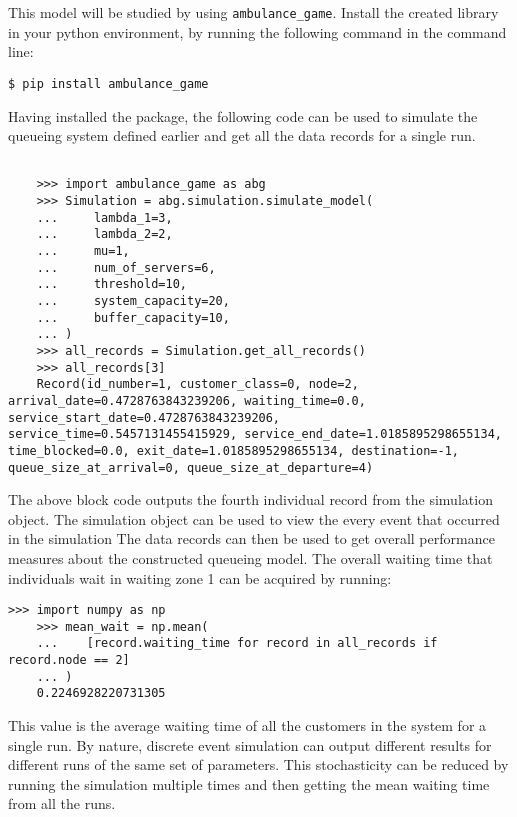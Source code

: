 This model will be studied by using  
\lstinline[style=pystyle]{ambulance_game}.
Install the created library in your python environment, by running the 
following command in the command line:
\begin{lstlisting}[style=terminalstyle]
    $ pip install ambulance_game
\end{lstlisting}

Having installed the package, the following code can be used to simulate the 
queueing system defined earlier and get all the data records for a single run.

\begin{lstlisting}[style=pystyle]
    
    >>> import ambulance_game as abg
    >>> Simulation = abg.simulation.simulate_model(
    ...     lambda_1=3,
    ...     lambda_2=2,
    ...     mu=1,
    ...     num_of_servers=6,
    ...     threshold=10,
    ...     system_capacity=20,
    ...     buffer_capacity=10,
    ... )
    >>> all_records = Simulation.get_all_records()
    >>> all_records[3]
    Record(id_number=1, customer_class=0, node=2, arrival_date=0.4728763843239206, waiting_time=0.0, service_start_date=0.4728763843239206, service_time=0.5457131455415929, service_end_date=1.0185895298655134, time_blocked=0.0, exit_date=1.0185895298655134, destination=-1, queue_size_at_arrival=0, queue_size_at_departure=4)
\end{lstlisting}

The above block code outputs the fourth individual record from the simulation
object.
The simulation object can be used to view the every event that occurred in the 
simulation 
The data records can then be used to get overall performance measures about the
constructed queueing model.
The overall waiting time that individuals wait in waiting zone 1 can be acquired 
by running:


\begin{lstlisting}[style=pystyle]
    >>> import numpy as np
    >>> mean_wait = np.mean(
    ...    [record.waiting_time for record in all_records if record.node == 2]
    ... )
    0.2246928220731305
\end{lstlisting}

This value is the average waiting time of all the customers in the system for a
single run. 
By nature, discrete event simulation can output different results for different
runs of the same set of parameters.
This stochasticity can be reduced by running the simulation multiple times 
and then getting the mean waiting time from all the runs.

